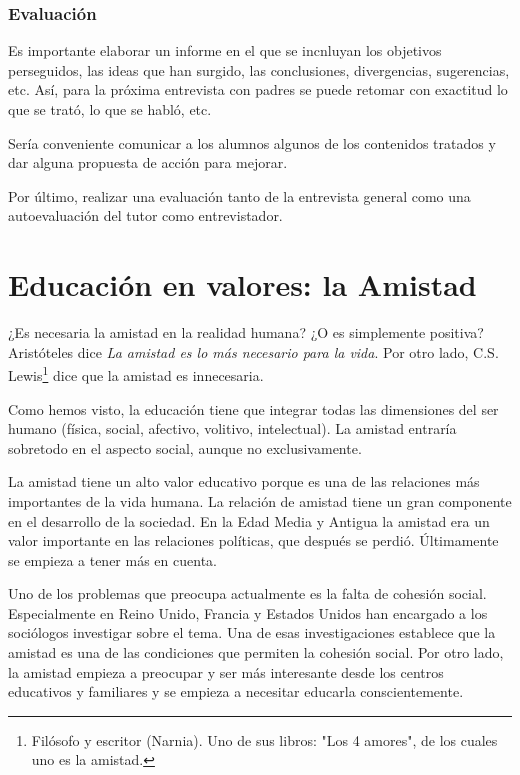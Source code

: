 \documentclass[palatino]{apuntesURJC}
\begin{document}
\subsection{Evaluación}

Es importante elaborar un informe en el que se incnluyan los objetivos perseguidos, las ideas que han surgido, las conclusiones, divergencias, sugerencias, etc.
%
Así, para la próxima entrevista con padres se puede retomar con exactitud lo que se trató, lo que se habló, etc.

Sería conveniente comunicar a los alumnos algunos de los contenidos tratados y dar alguna propuesta de acción para mejorar.

Por último, realizar una evaluación tanto de la entrevista general como una autoevaluación del tutor como entrevistador.

\chapter{Educación en valores: la Amistad}

¿Es necesaria la amistad en la realidad humana? ¿O es simplemente positiva?
%
Aristóteles dice \textit{La amistad es lo más necesario para la vida}. 
%
Por otro lado, C.S. Lewis\footnote{Filósofo y escritor (Narnia). Uno de sus libros: "Los 4 amores", de los cuales uno es la amistad.} dice que la amistad es innecesaria.

Como hemos visto, la educación tiene que integrar todas las dimensiones del ser humano (física, social, afectivo, volitivo, intelectual).
%
La amistad entraría sobretodo en el aspecto social, aunque no exclusivamente.

La amistad tiene un alto valor educativo porque es una de las relaciones más importantes de la vida humana.
%
La relación de amistad tiene un gran componente en el desarrollo de la sociedad.
%
En la Edad Media y Antigua la amistad era un valor importante en las relaciones políticas, que después se perdió.
%
Últimamente se empieza a tener más en cuenta.

Uno de los problemas que preocupa actualmente es la falta de cohesión social. 
%
Especialmente en Reino Unido, Francia y Estados Unidos han encargado a los sociólogos investigar sobre el tema.
%
Una de esas investigaciones establece que la amistad es una de las condiciones que permiten la cohesión social.
%
Por otro lado, la amistad empieza a preocupar y ser más interesante desde los centros educativos y familiares y se empieza a necesitar educarla conscientemente.
\end{document}
